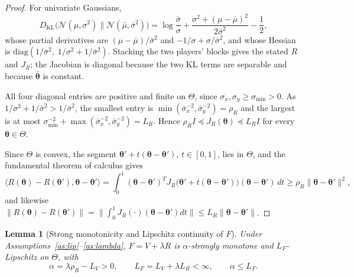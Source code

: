 \documentclass{article}
\newtheorem{lemma}[theorem]{Lemma}
\theoremstyle{definition}
\theoremstyle{remark}
\begin{document}
\begin{proof}
For univariate Gaussians,
\begin{equation}
D_{\mathrm{KL}}\big(\mathcal{N}(\mu,\sigma^2) \parallel \mathcal{N}(\bar\mu,\bar\sigma^2)\big)
= \log\frac{\bar\sigma}{\sigma} + \frac{\sigma^{2} + (\mu - \bar\mu)^{2}}{2 \bar\sigma^{2}} - \frac{1}{2},
\end{equation}
whose partial derivatives are $(\mu - \bar\mu)/\bar\sigma^{2}$ and $-1/\sigma + \sigma/\bar\sigma^{2}$, and whose
Hessian is $\mathrm{diag}(1/\bar\sigma^{2},\; 1/\sigma^{2} + 1/\bar\sigma^{2})$. Stacking the two players'
blocks gives the stated $R$ and $J_R$; the Jacobian is diagonal because the two KL terms are separable and
because $\bar{\boldsymbol{\theta}}$ is constant.

All four diagonal entries are positive and finite on $\Theta$, since $\sigma_x, \sigma_y \ge \sigma_{\min} > 0$.
As $1/\sigma^{2} + 1/\bar\sigma^{2} > 1/\bar\sigma^{2}$, the smallest entry is
$\min(\bar\sigma_x^{-2}, \bar\sigma_y^{-2}) = \rho_R$ and the largest is at most
$\sigma_{\min}^{-2} + \max(\bar\sigma_x^{-2}, \bar\sigma_y^{-2}) = L_R$. Hence
$\rho_R I \preceq J_R(\boldsymbol{\theta}) \preceq L_R I$ for every $\boldsymbol{\theta} \in \Theta$.

Since $\Theta$ is convex, the segment $\boldsymbol{\theta}' + t(\boldsymbol{\theta} - \boldsymbol{\theta}')$,
$t \in [0,1]$, lies in $\Theta$, and the fundamental theorem of calculus gives
\begin{equation}
\langle R(\boldsymbol{\theta}) - R(\boldsymbol{\theta}'), \boldsymbol{\theta} - \boldsymbol{\theta}' \rangle
= \int_0^1 (\boldsymbol{\theta} - \boldsymbol{\theta}')^{T}
J_R\big(\boldsymbol{\theta}' + t(\boldsymbol{\theta} - \boldsymbol{\theta}')\big)
(\boldsymbol{\theta} - \boldsymbol{\theta}') \, dt
\ge \rho_R \|\boldsymbol{\theta} - \boldsymbol{\theta}'\|^{2},
\end{equation}
and likewise
$\|R(\boldsymbol{\theta}) - R(\boldsymbol{\theta}')\|
= \big\| \int_0^1 J_R(\cdot)(\boldsymbol{\theta} - \boldsymbol{\theta}') dt \big\|
\le L_R \|\boldsymbol{\theta} - \boldsymbol{\theta}'\|$.
\end{proof}

\begin{lemma}[Strong monotonicity and Lipschitz continuity of $F$]\label{lem:F}
Under Assumptions~\ref{as:lip}--\ref{as:lambda}, $F = V + \lambda R$ is $\alpha$-strongly monotone and
$L_F$-Lipschitz on $\Theta$, with
\begin{equation}
\alpha = \lambda \rho_R - L_V > 0,
\qquad
L_F = L_V + \lambda L_R < \infty,
\qquad
\alpha \le L_F .
\end{equation}
\end{lemma}
\end{document}
